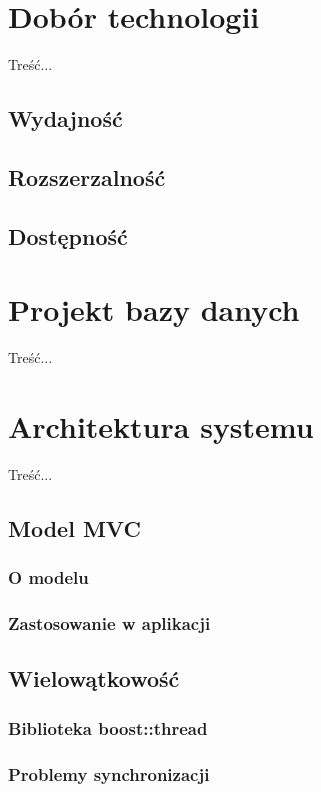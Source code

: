 {\section[Dobór technologii][Dobór technologii]{Dobór technologii}
\par{ Treść... }
\subsection{Wydajność}
\subsection{Rozszerzalność}
\subsection{Dostępność}

\section[Projekt bazy danych][Projekt bazy danych]{Projekt bazy danych}
\par{ Treść... }

\section[Architektura systemu][Architektura systemu]{Architektura systemu}
\par{ Treść... }
\subsection{Model MVC}
\subsubsection{O modelu}
\subsubsection{Zastosowanie w aplikacji}
\subsection{Wielowątkowość}
\subsubsection{Biblioteka boost::thread}
\subsubsection{Problemy synchronizacji}

}

